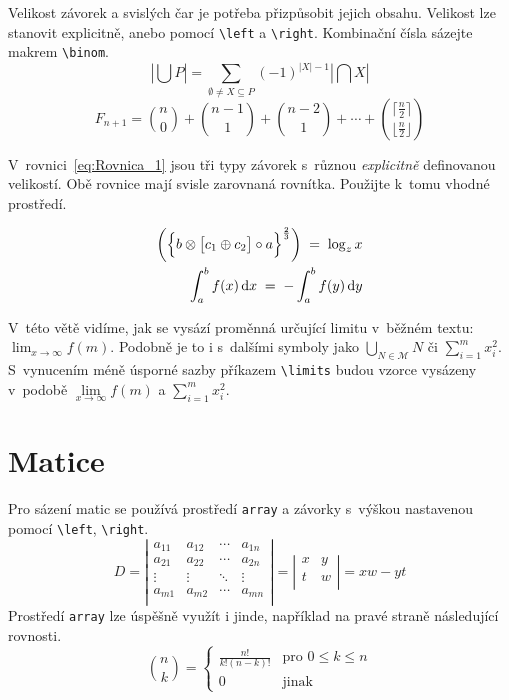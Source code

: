 \documentclass[twocolumn,11pt]{article}
\begin{document}
Velikost závorek a svislých čar je potřeba přizpůsobit jejich obsahu. Velikost lze stanovit explicitně, anebo pomocí \verb|\left| a \verb|\right|. Kombinační čísla sázejte makrem \verb|\binom|.
\begin{displaymath}
    \left|\bigcup P\right|=\sum\limits_{\emptyset\neq X \subseteq P} (-1)^{|X|-1}\left|\bigcap X\right|
\end{displaymath}
\begin{displaymath}
    F_{n+1}=\binom{n}{0}+\binom{n-1}{1}+\binom{n-2}{1}+\cdots+\binom{\lceil \frac{n}{2}\rceil}{\lfloor \frac{n}{2}\rfloor}
\end{displaymath}

V~rovnici~\eqref{eq:Rovnica_1} jsou tři typy závorek s~různou \emph{explicitně} definovanou velikostí. Obě rovnice mají svisle zarovnaná rovnítka. Použijte k~tomu vhodné prostředí.

\begin{eqnarray}
    \biggl( \Bigl\{ b\otimes \bigl[c_1 \oplus c_2 \bigr] \circ a \Bigr\} ^{\frac{2}{3}}\biggr) \;=\;\log_z x\label{eq:Rovnica_1}\\
    \int_a^b f(x)\, \mathrm{d}x \;=\; -\int_a^b f(y)\, \mathrm{d}y\label{eq:Rovnica_2}
\end{eqnarray}

V~této větě vidíme, jak se vysází proměnná určující limitu v~běžném textu: $\lim_{x\to\infty} f(m)$. Podobně je to i s~dalšími symboly jako $\bigcup_{N\in\mathcal{M}}N$ či $\sum_{i=1}^m x_i^2$. S~vynucením méně úsporné sazby příkazem \verb|\limits| budou vzorce vysázeny v~podobě $\lim\limits_{x\to\infty} f(m)$ a $\sum\limits_{i=1}^m x_i^2$.

\section{Matice}
Pro sázení matic se používá prostředí \texttt{array} a závorky s~výškou nastavenou pomocí \verb|\left|, \verb|\right|.
    $$ 
    D = \left|
    \begin{array}{cccc}
         a_{11} & a_{12} & \cdots & a_{1n} \\
         a_{21} & a_{22} & \cdots & a_{2n} \\
         \vdots & \vdots & \ddots & \vdots \\
         a_{m1} & a_{m2} & \cdots & a_{mn} \\
    \end{array}\right|
    = \left|
    \begin{array}{cc}
         x & y \\
         t & w \\
    \end{array}\right|
    = xw - yt
    $$
Prostředí \texttt{array} lze úspěšně využít i jinde, například na pravé straně následující rovnosti.
  $$\binom{n}{k} = \left\{
    \begin{array}{cl}
         \frac{n!}{k!(n-k)!} & \text{pro } 0\leq k\leq  n\\ 
         0 & \text{jinak}
    \end{array} \right.
   $$
\end{document}
